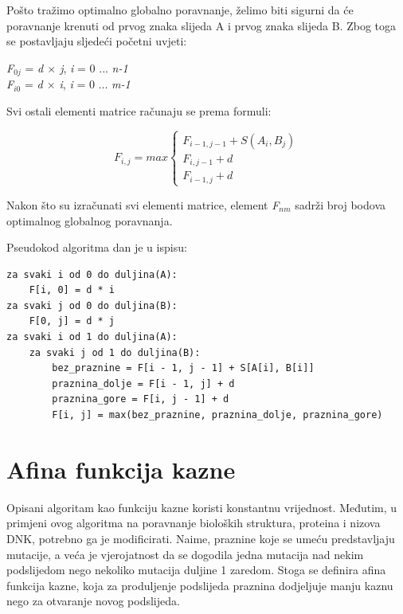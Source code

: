 \documentclass[times, utf8, zavrsni]{fer}
\begin{document}
Pošto tražimo optimalno globalno poravnanje, želimo biti sigurni da će poravnanje krenuti od prvog znaka slijeda A i prvog znaka slijeda B. Zbog toga se postavljaju sljedeći početni uvjeti:
\begin{center}
\textit{F$_{0j}$} = \textit{d $\times$ j}, \textit{i} = 0 ... \textit{n-1}\\
\textit{F$_{i0}$} = \textit{d $\times$ i}, \textit{i} = 0 ... \textit{m-1}
\end{center}
Svi ostali elementi matrice računaju se prema formuli:
\begin{center}
$$
F_{i,j} = \textit{max}\left\{
	\begin{array}{lr}
		F_{i-1,j-1} + S(A_{i}, B_{j}) \\
		F_{i, j-1} + d \\
		F_{i-1, j} + d
	\end{array}
\right.
$$
\end{center}

Nakon što su izračunati svi elementi matrice, element \textit{F$_{nm}$} sadrži broj bodova optimalnog globalnog poravnanja.

Pseudokod algoritma dan je u ispisu:

\begin{singlespace}
\begin{lstlisting}[caption={Needleman-Wunschov algoritam},label={needleman_wunsch}]
za svaki i od 0 do duljina(A):
	F[i, 0] = d * i
za svaki j od 0 do duljina(B):
	F[0, j] = d * j
za svaki i od 1 do duljina(A):
	za svaki j od 1 do duljina(B):
		bez_praznine = F[i - 1, j - 1] + S[A[i], B[i]]
		praznina_dolje = F[i - 1, j] + d
		praznina_gore = F[i, j - 1] + d
		F[i, j] = max(bez_praznine, praznina_dolje, praznina_gore)
\end{lstlisting}
\end{singlespace}

\section{Afina funkcija kazne}
\indent

Opisani algoritam kao funkciju kazne koristi konstantnu vrijednost. Međutim, u primjeni ovog algoritma na poravnanje bioloških struktura, proteina i nizova DNK, potrebno ga je modificirati. Naime, praznine koje se umeću predstavljaju mutacije, a veća je vjerojatnost da se dogodila jedna mutacija nad nekim podslijedom nego nekoliko mutacija duljine 1 zaredom. Stoga se definira afina funkcija kazne, koja za produljenje podslijeda praznina dodjeljuje manju kaznu nego za otvaranje novog podslijeda.
\end{document}
